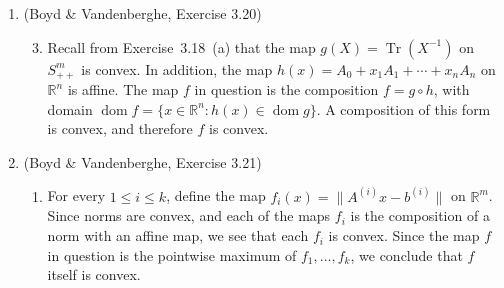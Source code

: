 \documentclass[letterpaper,12pt]{article}
\DeclareMathOperator{\Tr}{Tr}
\DeclareMathOperator{\dom}{dom}
\begin{document}
\begin{enumerate}
\item (Boyd \& Vandenberghe, Exercise 3.20)
\begin{enumerate}
\setcounter{enumii}{2}
\item Recall from Exercise~3.18~(a) that the map $g(X) = \Tr(X^{-1})$
  on $S^m_{++}$ is convex. In addition, the map
  $h(x) = A_0 + x_1 A_1 + \cdots + x_n A_n$ on $\mathbb{R}^n$ is
  affine. The map $f$ in question is the composition $f = g \circ h$,
  with domain $\dom f = \{x \in \mathbb{R}^n : h(x) \in \dom g\}$. A
  composition of this form is convex, and therefore $f$ is convex.
\end{enumerate}

\item (Boyd \& Vandenberghe, Exercise 3.21)
\begin{enumerate}
\item For every $1 \leq i \leq k$, define the map
  $f_i(x) = \lVert A^{(i)}x - b^{(i)} \rVert$ on $\mathbb{R}^m$. Since
  norms are convex, and each of the maps $f_i$ is the composition of a
  norm with an affine map, we see that each $f_i$ is convex. Since the
  map $f$ in question is the pointwise maximum of $f_1, \ldots, f_k$,
  we conclude that $f$ itself is convex.
\end{enumerate}

\end{enumerate}
\end{document}
